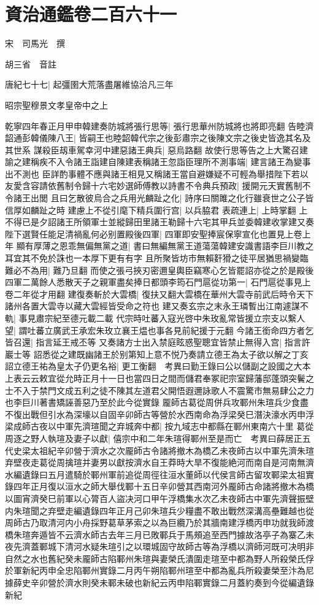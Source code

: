 \section{資治通鑑卷二百六十一}
宋　司馬光　撰

胡三省　音註

唐紀七十七|{
	起彊圉大荒落盡屠維協洽凡三年}


昭宗聖穆景文孝皇帝中之上

乾寧四年春正月甲申韓建奏防城將張行思等|{
	張行思華州防城將也將即亮翻}
告睦濟韶通彭韓儀陳八王|{
	皆嗣王也睦韶韓代宗之後彭肅宗之後陳文宗之後史皆逸其名及其世系}
謀殺臣刼車駕幸河中建惡諸王典兵|{
	惡烏路翻}
故使行思等告之上大驚召建諭之建稱疾不入令諸王詣建自陳建表稱諸王忽詣臣理所不測事端|{
	建言諸王為變事出不測也}
臣詳酌事體不應與諸王相見又稱諸王當自避嫌疑不可輕為舉措陛下若以友愛含容請依舊制令歸十六宅妙選師傅教以詩書不令典兵預政|{
	援開元天實舊制不令諸王出閭}
且曰乞散彼烏合之兵用光麟趾之化|{
	詩序曰關雎之化行雖衰世之公子皆信厚如麟趾之時}
建慮上不從引麾下精兵圍行宫|{
	以兵脇君}
表疏連上|{
	上時掌翻}
上不得已是夕詔諸王所領軍士並縱歸田里諸王勒歸十六宅其甲兵並委韓建收掌建又奏陛下選賢任能足清禍亂何必别置殿後四軍|{
	四軍即安聖捧宸保寧宣化也置見上卷上年}
顯有厚薄之恩乖無偏無黨之道|{
	書曰無編無黨王道蕩蕩韓建安識書語李巨川教之耳宜其不免於誅也一本厚下更有有字}
且所聚皆坊市無賴姧猾之徒平居猶思禍變臨難必不為用|{
	難乃旦翻}
而使之張弓挾刃密邇皇輿臣竊寒心乞皆罷詔亦從之於是殿後四軍二萬餘人悉散天子之親軍盡矣捧日都頭李筠石門扈從功第一|{
	石門扈從事見上卷二年從才用翻}
建復奏斬於大雲橋|{
	復扶又翻大雲橋在華州大雲寺前武后時令天下諸州各置大雲寺以藏大雲經皆受命之符也}
建又奏玄宗之末永王璘暫出江南遽謀不軌|{
	事見肅宗紀至德元載二載}
代宗時吐蕃入寇光啓中朱玫亂常皆援立宗支以繫人望|{
	謂吐蕃立廣武王承宏朱玫立襄王煴也事各見前紀援于元翻}
今諸王銜命四方者乞皆召還|{
	指言延王戒丕等}
又奏諸方士出入禁庭眩惑聖聰宜皆禁止無得入宫|{
	指言許巖士等}
詔悉從之建既幽諸王於别第知上意不悦乃奏請立德王為太子欲以解之丁亥詔立德王祐為皇太子仍更名裕|{
	更工衡翻　考異曰勤王錄曰公以儲副之設國之大本上表云云敕宜從允時正月十一日也當四日之間而儲君奉冢祀宗室歸藩邸蓬頭突鬢之士不入于禁門文成五利之徒不陳其左道君父開悟遐邇詠歌人不震驚市無易肆公之力也李巨川著書矯誣善惡乃至於此今從實錄}
龎師古葛從周併兵攻鄆州朱瑄兵少食盡不復出戰但引水為深壕以自固辛卯師古等營於水西南命為浮梁癸巳潛決濠水丙申浮梁成師古夜以中軍先濟瑄聞之弃城奔中都|{
	按九域志中都縣在鄆州東南六十里}
葛從周逐之野人執瑄及妻子以獻|{
	僖宗中和二年朱瑄得鄆州至是而亡　考異曰薛居正五代史梁太祖紀辛卯營于濟水之次龎師古令諸將撤木為橋乙未夜師古以中軍先濟朱瑄弃壁夜走葛從周擒瑄并妻男以獻按濟水自王莽時大旱不復能絶河而南自是河南無濟水編遺錄曰五月遣騎於鄆州軍前追從周徑往洹水董師以代侯言師古留攻鄆梁太祖實錄四年正月復以洹水之師大舉伐鄆十五日辛卯營其西南河外龎師古命諸將撤木為橋以圖宵濟癸巳前軍以心膂百人盜决河口甲午浮橋集水次乙未夜師古中軍先濟聲振壁内朱瑄聞之弃壁走編遺錄四年正月己卯朱瑄兵少糧盡不敢出戰然深溝高壘難越也從周師古乃取清河内小舟採野葛草茅索之以為巨纜乃於其牆南建浮橋丙申功就我師渡橋朱瑄奔遁皆不云濟水師古去年三月已敗鄆兵于馬頰追至西門據故洛亭子為寨乙未夜先濟蓋鄆城下清河水疑朱瑄引之以環城固守故師古等為浮橋以濟師河既可决明非自然之水也舊紀癸未龎師古陷鄆州朱瑄與妻榮氏潰圍走瑄至中都為野人所殺榮氏俘於軍新紀丙申全忠陷鄆州實錄二月丙午朔陷鄆州瑄至中都為亂兵所殺妻榮至汴為尼據薛史辛卯營於濟水則癸未鄆未破也新紀云丙申陷鄆實錄二月蓋約奏到今從編遺錄新紀}
